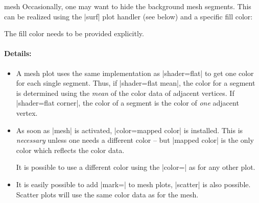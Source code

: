 {\begin{plottype}[/pgfplots]{mesh}
	Occasionally, one may want to hide the background mesh segments. This can be realized using the |surf| plot handler (see below) and a specific fill color:
\pgfplotsexpensiveexample
\begin{codeexample}[]
\end{codeexample}
	The fill color needs to be provided explicitly.

	\paragraph{Details:}
	\begin{itemize}
		\item 
	A mesh plot uses the same implementation as |shader=flat| to get one color for each single segment. Thus, if |shader=flat mean|, the color for a segment is determined using the \emph{mean} of the color data of adjacent vertices. If |shader=flat corner|, the color of a segment is the color of \emph{one} adjacent vertex.
		\item As soon as |mesh| is activated, |color=mapped color| is installed. This is \emph{necessary} unless one needs a different color -- but |mapped color| is the only color which reflects the color data.

		It is possible to use a different color using the |color=| as for any other plot.

		\item It is easily possible to add |mark=| to mesh plots, |scatter| is also possible. Scatter plots will use the same color data as for the mesh.
	\end{itemize}

\pgfplotsexpensiveexample
\begin{codeexample}[]
\end{codeexample}
	

\end{plottype}}
